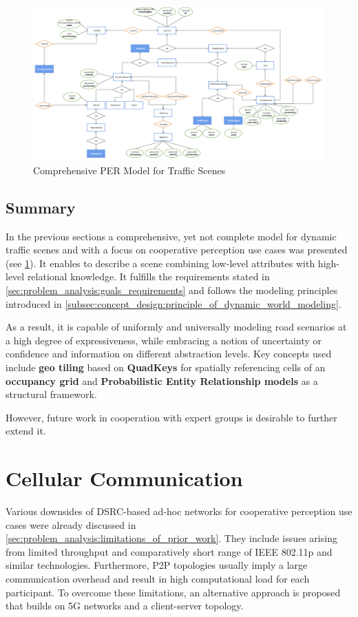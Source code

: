 \begin{figure}
	\centering
	\includegraphics[width=\linewidth]{98_images/scene_representation_er}
	\caption{Comprehensive PER Model for Traffic Scenes}
	\label{fig:final_model}
\end{figure}

\subsection{Summary}
\label{subsec:concept_design:modeling:summary}
In the previous sections a comprehensive, yet not complete model for dynamic traffic scenes and with a focus on cooperative perception use cases was presented (see \cref{fig:final_model}). It enables to describe a scene combining low-level attributes with high-level relational knowledge. It fulfills the requirements stated in \cref{sec:problem_analysis:goals_requirements} and follows the modeling principles introduced in \cref{subsec:concept_design:principle_of_dynamic_world_modeling}. 

As a result, it is capable of uniformly and universally modeling road scenarios at a high degree of expressiveness, while embracing a notion of uncertainty or confidence and information on different abstraction levels. Key concepts used include \textbf{geo tiling} based on \textbf{QuadKeys} for spatially referencing cells of an \textbf{occupancy grid} and \textbf{Probabilistic Entity Relationship models} as a structural framework.

However, future work in cooperation with expert groups is desirable to further extend it.

\section{Cellular Communication}
\label{sec:concept_design:cellular_communication}
Various downsides of DSRC-based ad-hoc networks for cooperative perception use cases were already discussed in \cref{sec:problem_analysis:limitations_of_prior_work}. They include issues arising from limited throughput and comparatively short range of IEEE 802.11p and similar technologies. Furthermore, P2P topologies usually imply a large communication overhead and result in high computational load for each participant. To overcome these limitations, an alternative approach is proposed that builds on 5G networks and a client-server topology.

